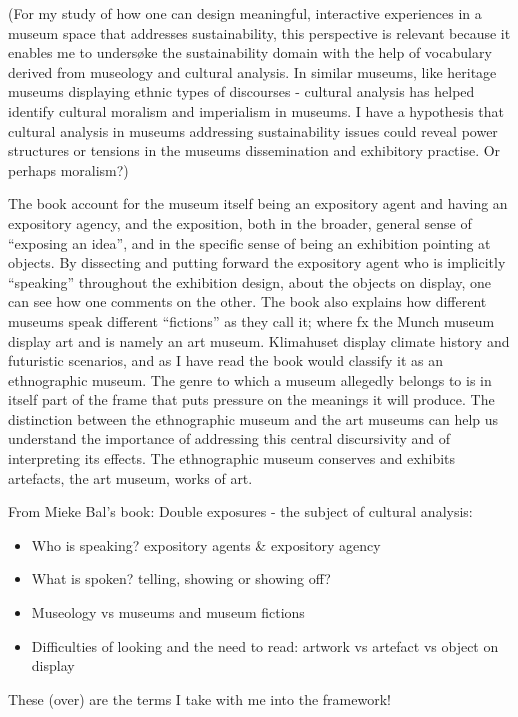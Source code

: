 (For my study of how one can design meaningful, interactive experiences in a museum space that addresses sustainability, this perspective is relevant because it enables me to undersøke the sustainability domain with the help of vocabulary derived from museology and cultural analysis. In similar museums, like heritage museums displaying ethnic types of discourses - cultural analysis has helped identify cultural moralism and imperialism in museums. I have a hypothesis that cultural analysis in museums addressing sustainability issues could reveal power structures or tensions in the museums dissemination and exhibitory practise. Or perhaps moralism?)

The book account for the museum itself being an expository agent and having an expository agency, and the exposition, both in the broader, general sense of “exposing an idea”, and in the specific sense of being an exhibition pointing at objects. By dissecting and putting forward the expository agent who is implicitly “speaking” throughout the exhibition design, about the objects on display, one can see how one comments on the other. The book also explains how different museums speak different “fictions” as they call it; where fx the Munch museum display art and is namely an art museum. Klimahuset display climate history and futuristic scenarios, and as I have read the book would classify it as an ethnographic museum. The genre to which a museum allegedly belongs to is in itself part of the frame that puts pressure on the meanings it will produce. The distinction between the ethnographic museum and the art museums can help us understand the importance of addressing this central discursivity and of interpreting its effects. The ethnographic museum conserves and exhibits artefacts, the art museum, works of art.

\break
From Mieke Bal’s book: Double exposures - the subject of cultural analysis:
\begin{itemize}
    \item Who is speaking? expository agents & expository agency
    \item What is spoken? telling, showing or showing off?
    \item Museology vs museums and museum fictions
    \item Difficulties of looking and the need to read: artwork vs artefact vs object on display
\end{itemize}


These (over) are the terms I take with me into the framework!
